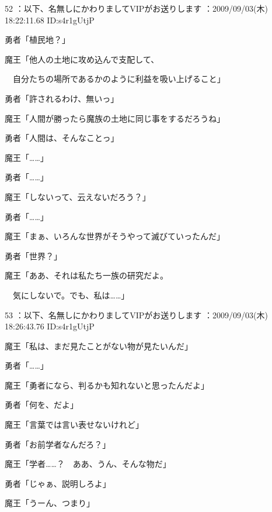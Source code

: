 \documentclass[a4j,twocolumn]{tarticle}
\begin{document}
	

	

52 ：以下、名無しにかわりましてVIPがお送りします ：2009/09/03(木) 18:22:11.68 ID:s4r1gUtjP 


勇者「植民地？」 



魔王「他人の土地に攻め込んで支配して、\par{} 
　自分たちの場所であるかのように利益を吸い上げること」 



勇者「許されるわけ、無いっ」 



魔王「人間が勝ったら魔族の土地に同じ事をするだろうね」 



勇者「人間は、そんなことっ」 



魔王「……」\par{} 
勇者「……」 



魔王「しないって、云えないだろう？」 



勇者「……」 



魔王「まぁ、いろんな世界がそうやって滅びていったんだ」\par{} 
勇者「世界？」 



魔王「ああ、それは私たち一族の研究だよ。\par{} 
　気にしないで。でも、私は……」 

	

	

53 ：以下、名無しにかわりましてVIPがお送りします ：2009/09/03(木) 18:26:43.76 ID:s4r1gUtjP 


魔王「私は、まだ見たことがない物が見たいんだ」\par{} 
勇者「……」 



魔王「勇者になら、判るかも知れないと思ったんだよ」\par{} 
勇者「何を、だよ」 



魔王「言葉では言い表せないけれど」\par{} 
勇者「お前学者なんだろ？」\par{} 
魔王「学者……？　ああ、うん、そんな物だ」 



勇者「じゃぁ、説明しろよ」\par{} 
魔王「うーん、つまり」 
\end{document}
